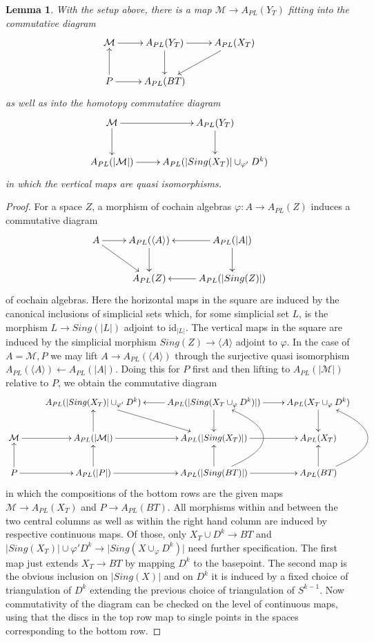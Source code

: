 \documentclass[12pt,a4paper]{article}
\newcommand{\id}{\mathrm{id}}
\newtheorem{lem}[thm]{Lemma}
\theoremstyle{definition}
\begin{document}
\begin{lem}\label{lem:diagramirrsinn}
With the setup above, there is a map $\mathcal{M}\rightarrow A_{PL}(Y_T)$ fitting into the commutative diagram
\[\xymatrix{ \mathcal{M}\ar[r] & A_{PL}(Y_T)\ar[d]\ar[r]& A_{PL}(X_T)\ar[dl] \\ P\ar[u]\ar[r] & A_{PL}(BT)& }\]
as well as into the homotopy commutative diagram
\[\xymatrix{
\mathcal{M}\ar[d] \ar[r] &  A_{PL}(Y_T)\ar[d]\\
A_{PL}(\vert\mathcal{M}\vert)\ar[r] & A_{PL}(\vert Sing(X_T)\vert\cup_{\varphi'} D^k)
}\]
in which the vertical maps are quasi isomorphisms.

\end{lem}

\begin{proof}
For a space $Z$, a morphism of cochain algebras $\varphi\colon A\rightarrow A_{PL}(Z)$ induces a commutative diagram
\[\xymatrix{
A \ar[r]\ar[dr] & A_{PL}(\langle A\rangle)\ar[d] &\ar[l] A_{PL}(\vert A\vert)\ar[d]\\ & A_{PL}( Z)& \ar[l] A_{PL}(\vert Sing(Z)\vert)
}\]
of cochain algebras. Here the horizontal maps in the square are induced by the canonical inclusions of simplicial sets which, for some simplicial set $L$, is the morphism $L\rightarrow Sing(\vert L\vert)$ adjoint to $\id_{\vert L\vert}$. The vertical maps in the square are induced by the simplicial morphism $Sing(Z)\rightarrow \langle A\rangle$ adjoint to $\varphi$. In the case of $A=\mathcal{M},P$ we may lift $A\rightarrow A_{PL}(\langle A\rangle)$ through the surjective quasi isomorphism $A_{PL}(\langle A\rangle)\leftarrow A_{PL}(\vert A\vert)$. Doing this for $P$ first and then lifting to $A_{PL}(\vert\mathcal{M}\vert)$ relative to $P$, we obtain the commutative diagram
\[\xymatrix{
& A_{PL}(\vert Sing(X_T)\vert \cup_{\varphi'} D^k)\ar[dr] & A_{PL}(\vert Sing(X_T\cup_\varphi D^k)\vert)\ar[l]\ar[d]\ar[r] & A_{PL}(X_T\cup_\varphi D^k)\ar[d]\\
\mathcal{M}\ar[r]& A_{PL}(\vert\mathcal{M}\vert)\ar[u]\ar[r]& A_{PL}(\vert Sing(X_T)\vert)\ar[r]& A_{PL}(X_T)\\
P\ar[u]\ar[r]& A_{PL}(\vert P\vert)\ar[r]\ar[u]& A_{PL}(\vert Sing(BT)\vert)\ar[r]\ar[u]\ar@/_{2.0cm}/[uu]& A_{PL}(BT)\ar[u]\ar@/_{2.0cm}/[uu]
}\]
in which the compositions of the bottom rows are the given maps $\mathcal{M}\rightarrow A_{PL}(X_T)$ and $P\rightarrow A_{PL}(BT)$. All morphisms within and between the two central columns as well as within the right hand column are induced by respective continuous maps. Of those, only $X_T\cup D^k\rightarrow BT$ and $\vert Sing(X_T)\vert \cup \varphi' D^k\rightarrow \vert Sing(X\cup_\varphi D^k)\vert$ need further specification. The first map just extends $X_T\rightarrow BT$ by mapping $D^k$ to the basepoint. The second map is the obvious inclusion on $\vert Sing(X)\vert$ and on $D^k$ it is induced by a fixed choice of triangulation of $D^k$ extending the previous choice of triangulation of $S^{k-1}$. Now commutativity of the diagram can be checked on the level of continuous maps, using that the discs in the top row map to single points in the spaces corresponding to the bottom row.


\end{proof}
\end{document}
